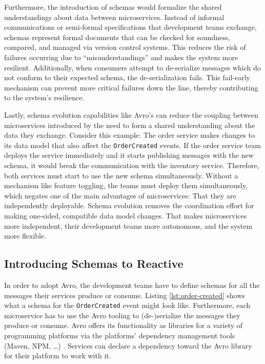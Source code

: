 Furthermore, the introduction of schemas would formalize the shared understandings about data between microservices.
Instead of informal communications or semi-formal specifications that development teams exchange, schemas represent formal documents that can be checked for soundness, compared, and managed via version control systems.
This reduces the risk of failures occurring due to \enquote{misunderstandings} and makes the system more resilient.
Additionally, when consumers attempt to de-serialize messages which do not conform to their expected schema, the de-serialization fails.
This fail-early mechanism can prevent more critical failures down the line, thereby contributing to the system's resilience.

Lastly, schema evolution capabilities like Avro's can reduce the coupling between microservices introduced by the need to form a shared understanding about the data they exchange.
Consider this example: The order service makes changes to its data model that also affect the \texttt{OrderCreated} events.
If the order service team deploys the service immediately and it starts publishing messages with the new schema, it would break the communication with the inventory service.
Therefore, both services must start to use the new schema simultaneously.
Without a mechanism like feature toggling, the teams must deploy them simultaneously, which negates one of the main advantages of microservices: That they are independently deployable.
Schema evolution removes the coordination effort for making one-sided, compatible data model changes.
That makes microservices more independent, their development teams more autonomous, and the system more flexible.

\subsection{Introducing Schemas to Reactive }\label{sec:introducing-schemas}

In order to adopt Avro, the development teams have to define schemas for all the messages their services produce or consume.
Listing \ref{lst:order-created} shows what a schema for the \texttt{OrderCreated} event might look like.
Furthermore, each microservice has to use the Avro tooling to (de-)serialize the messages they produce or consume.
Avro offers its functionality as libraries for a variety of programming platforms via the platforms' dependency management tools (Maven, NPM, \ldots) \parencite{avro}.
Services can declare a dependency toward the Avro library for their platform to work with it.

